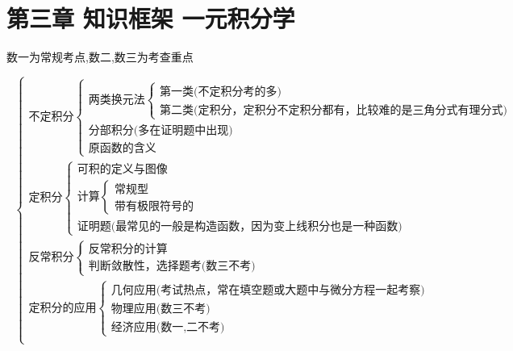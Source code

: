 \documentclass[a4paper,11pt]{book}
\begin{document}
\chapter*{第三章 知识框架 \quad 一元积分学}
\begin{center}
    数一为常规考点,数二,数三为考查重点    
\end{center}

\[
\text{\ }
\begin{cases}
    \text{不定积分}
        \begin{cases}
            \text{两类换元法}
                \begin{cases}
                    \text{第一类(不定积分考的多)}\\
                    \text{第二类(定积分，定积分不定积分都有，比较难的是三角分式有理分式)}

                \end{cases}\\
            \text{分部积分(多在证明题中出现)}\\
            \text{原函数的含义}
        \end{cases}\\
    \text{定积分}
        \begin{cases}
            \text{可积的定义与图像}\\
            \text{计算}
                \begin{cases}
                    \text{常规型}\\
                    \text{带有极限符号的}
                \end{cases}\\
            \text{证明题(最常见的一般是构造函数，因为变上线积分也是一种函数)}
        \end{cases}\\
    \text{反常积分}
        \begin{cases}
            \text{反常积分的计算}\\
            \text{判断敛散性，选择题考(数三不考)}
        \end{cases}\\
    \text{定积分的应用}
        \begin{cases}
            \text{几何应用(考试热点，常在填空题或大题中与微分方程一起考察)}\\
            \text{物理应用(数三不考)}\\
            \text{经济应用(数一,二不考)}
        \end{cases}\\
\end{cases}    
\]
\end{document}
